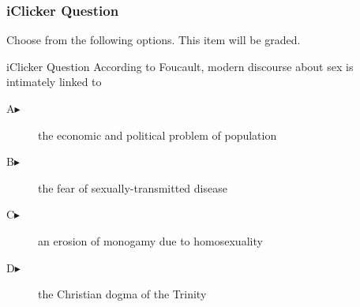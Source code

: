 \documentclass[xcolor=dvipsnames]{beamer}
\begin{document}
\begin{frame}
  \frametitle{iClicker Question}
Choose from the following options. This item will be graded.
\begin{block}{iClicker Question}
According to Foucault, modern discourse about sex is intimately linked to
\end{block}
\begin{description}
\item[A\hspace{.2in}$\blacktriangleright$] the economic and political problem of population
\item[B\hspace{.2in}$\blacktriangleright$] the fear of sexually-transmitted disease
\item[C\hspace{.2in}$\blacktriangleright$] an erosion of monogamy due to homosexuality
\item[D\hspace{.2in}$\blacktriangleright$] the Christian dogma of the Trinity
\end{description}
\end{frame}
\end{document}
